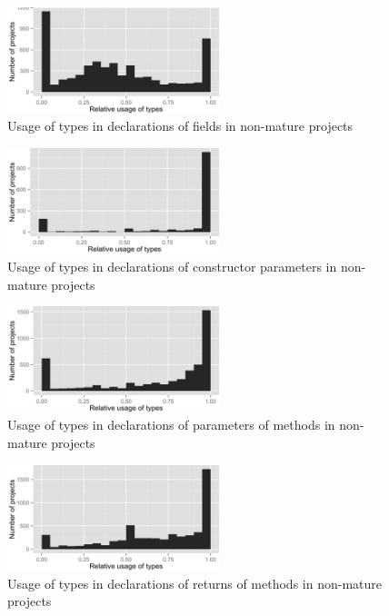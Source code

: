 \begin{figure}[h]
\centering 
\includegraphics[width=0.55\textwidth]{../aosd_2014/analysis/result/script/class/histograms/10_Field.png} 
\caption{Usage of types in declarations of fields in non-mature projects}
\end{figure}

\begin{figure}[h]
\centering 
\includegraphics[width=0.55\textwidth]{../aosd_2014/analysis/result/script/class/histograms/9_Constructor_Parameter.png} 
\caption{Usage of types in declarations of constructor parameters in non-mature projects}
\end{figure}

\begin{figure}[h]
\centering 
\includegraphics[width=0.55\textwidth]{../aosd_2014/analysis/result/script/class/histograms/8_Method_Parameter.png} 
\caption{Usage of types in declarations of parameters of methods in non-mature projects}
\end{figure}

\begin{figure}[h]
\centering 
\includegraphics[width=0.55\textwidth]{../aosd_2014/analysis/result/script/class/histograms/7_Method_Return.png} 
\caption{Usage of types in declarations of returns of methods in non-mature projects}
\end{figure}


